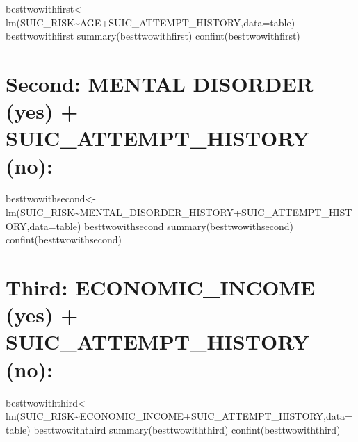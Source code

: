 \documentclass[
]{book}
\begin{document}
besttwowithfirst\textless-lm(SUIC\_RISK\textasciitilde AGE+SUIC\_ATTEMPT\_HISTORY,data=table)
besttwowithfirst
summary(besttwowithfirst)
confint(besttwowithfirst)

\hypertarget{second-mental-disorder-yes-suic_attempt_history-no-2}{%
\chapter{Second: MENTAL DISORDER (yes) + SUIC\_ATTEMPT\_HISTORY (no):}\label{second-mental-disorder-yes-suic_attempt_history-no-2}}

besttwowithsecond\textless-lm(SUIC\_RISK\textasciitilde MENTAL\_DISORDER\_HISTORY+SUIC\_ATTEMPT\_HISTORY,data=table)
besttwowithsecond
summary(besttwowithsecond)
confint(besttwowithsecond)

\hypertarget{third-economic_income-yes-suic_attempt_history-no}{%
\chapter{Third: ECONOMIC\_INCOME (yes) + SUIC\_ATTEMPT\_HISTORY (no):}\label{third-economic_income-yes-suic_attempt_history-no}}

besttwowiththird\textless-lm(SUIC\_RISK\textasciitilde ECONOMIC\_INCOME+SUIC\_ATTEMPT\_HISTORY,data=table)
besttwowiththird
summary(besttwowiththird)
confint(besttwowiththird)

\begin{verbatim}

\end{verbatim}

  
\end{document}
